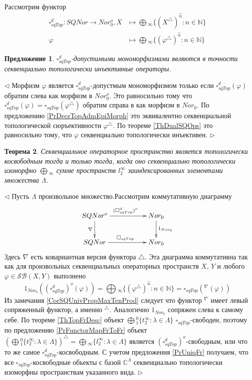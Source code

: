 \documentclass[12pt]{article}
\newtheorem{theorem}{Теорема}[subsection]
\newtheorem{proposition}[theorem]{Предложение}
\newenvironment{proof}{\par $\triangleleft$}{$\triangleright$}
\begin{document}
Рассмотрим 
функтор 
$$
\begin{aligned}
\square_{sqTop}^d : SQNor \to Nor_0^o, X &\mapsto \bigoplus{}_\infty \{(X^{\triangle })^{\wideparen{n}} : n \in \mathbb{N}\}\\
\varphi&\mapsto\bigoplus{}_\infty \{(\varphi^\triangle )^{\wideparen{n}} : n \in \mathbb{N}\}
\end{aligned}
$$

\begin{proposition}\label{PrDecsTopAdmMonoMorph}
$\square_{sqTop}^d$-допустимыми мономорфизмами являются в точности секвенциально топологически инъективные операторы.
\end{proposition}
\begin{proof}
Морфизм $\varphi$ является $\square_{sqTop}^d$-допустмым мономорфизмом только если $\square_{sqTop}^d(\varphi)$ обратим слева как морфизм в $Nor_0^o$. Это равносильно тому что 
$\square_{sqTop}^d(\varphi)=\square_{sqTop}(\varphi^\triangle)$ обратим справа в как морфизм в $Nor_0$. По предложению \ref{PrDecsTopAdmEpiMorph} это эквивалентно секвенциальной топологической сюръективности $\varphi^\triangle$. 
По теореме \ref{ThDualSQOps} это равносильно тому, что $\varphi$ секвенциально топологически инъективен.
\end{proof}
 
\begin{theorem}\label{ThTopCoFrDesc}
Секвенциальное операторное пространство является топологически косвободным тогда и только тогда, когда оно секвенциально топологически изоморфно $\bigoplus{}_\infty$ сумме пространств $l_2^\infty$ заиндексированных элементами множества $\Lambda$.
\end{theorem}
\begin{proof}
Пусть $\Lambda$ произвольное множество.Рассмотрим коммутативную диаграмму
$$
\xymatrix{
SQNor^o \ar[d]_{\nabla } \ar[rr]^{(\square_{sqTop}^d)^o} & & {Nor_0} \ar[d]^{1_{Nor_0}}\\
SQNor\ar[rr]^{\square_{sqTop}} & & {Nor_0}}
$$
Здесь $\nabla$ есть ковариантная версия функтора $\triangle$.
Эта диаграмма коммутативна так как для произвольных секвенциальных операторных пространств $X$, $Y$ и любого $\varphi\in\mathcal{SB}(X,Y)$ выполнено
$$
1_{Nor_0}((\square_{sqTop}^d)^o(\varphi))
=\bigoplus{}_\infty \{(\varphi^\triangle )^{\wideparen{n}} : n \in \mathbb{N}\}
=\square_{sqTop}({}^\nabla(\varphi))
$$
Из замечания \ref{CorSQUnivPropMaxTenProd} следует что функтор ${}^\nabla$ имеет левый сопряженный функтор, а именно ${}^\triangle$. Аналогично $1_{Nor_0}$ сопряжен слева к самому себе. 
По теореме \ref{ThTopFrDesc} объект $\bigoplus{}_1^0\{t_2^\infty:\lambda\in\Lambda\}$ $\square_{sqTop}$-свободен, поэтому по предложению \ref{PrFunctorMapFrToFr} объект 
$(\bigoplus{}_1^0\{t_2^\infty:\lambda\in\Lambda\})^\triangle=\bigoplus{}_\infty\{l_2^\infty:\lambda\in\Lambda\}$ является $(\square_{sqTop}^d)^o$-свободным, или что то же самое $\square_{sqTop}^d$-косвободным. С учетом предложения \ref{PrUniqFr} получаем, что все $\square_{sqTop}$-косвободные объекты с базой 
$\mathbb{C}^\Lambda$ секвенциально топологически изоморфны пространствам указанного вида.
\end{proof}
\end{document}
